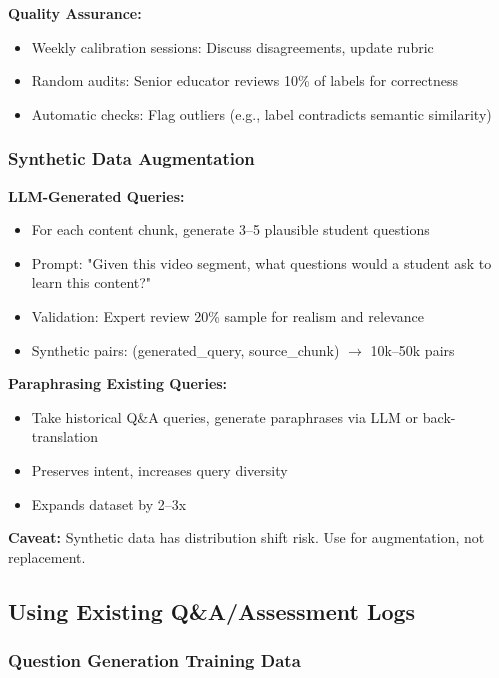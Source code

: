 \documentclass[11pt,letterpaper]{article}
\begin{document}
\textbf{Quality Assurance:}
\begin{itemize}
\item Weekly calibration sessions: Discuss disagreements, update rubric
\item Random audits: Senior educator reviews 10\% of labels for correctness
\item Automatic checks: Flag outliers (e.g., label contradicts semantic similarity)
\end{itemize}

\subsubsection{Synthetic Data Augmentation}\label{subsubsec:synthetic-data}

\textbf{LLM-Generated Queries:}
\begin{itemize}
\item For each content chunk, generate 3--5 plausible student questions
\item Prompt: "Given this video segment, what questions would a student ask to learn this content?"
\item Validation: Expert review 20\% sample for realism and relevance
\item Synthetic pairs: (generated\_query, source\_chunk) $\rightarrow$ 10k--50k pairs
\end{itemize}

\textbf{Paraphrasing Existing Queries:}
\begin{itemize}
\item Take historical Q\&A queries, generate paraphrases via LLM or back-translation
\item Preserves intent, increases query diversity
\item Expands dataset by 2--3x
\end{itemize}

\textbf{Caveat:} Synthetic data has distribution shift risk. Use for augmentation, not replacement.

\subsection{Using Existing Q\&A/Assessment Logs}\label{subsec:using-existing-logs}

\subsubsection{Question Generation Training Data}\label{subsubsec:question-gen-training}
\end{document}
